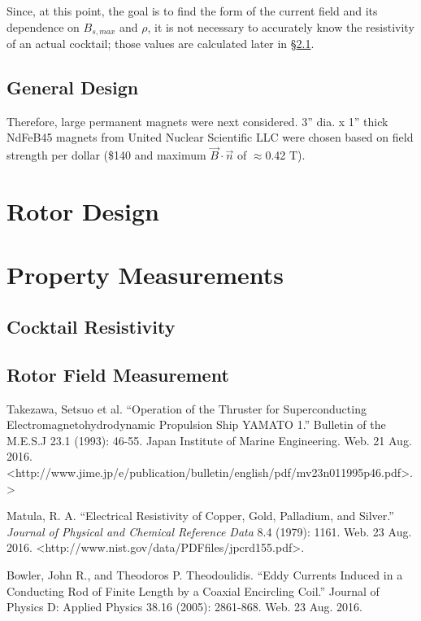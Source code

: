\documentclass[]{article}
\begin{document}
\par Since, at this point, the goal is to find the form of the current field and its dependence on $B_{s,max}$ and $\rho$, it is not necessary to accurately know the resistivity of an actual cocktail; those values are calculated later in \S\ref{sec:resistivity}.

\subsection{General Design}
\par Therefore, large permanent magnets were next considered. 3'' dia. x 1'' thick NdFeB45 magnets from United Nuclear Scientific LLC were chosen based on field strength per dollar (\$140 and maximum $\vec{B}\cdot\vec{n}$ of $\approx$0.42 T).

\section{Rotor Design}

\section{Property Measurements}
\subsection{Cocktail Resistivity}
\label{sec:resistivity}
\subsection{Rotor Field Measurement}



\begin{thebibliography}{3}
	Takezawa, Setsuo et al. ``Operation of the Thruster for Superconducting Electromagnetohydrodynamic Propulsion Ship YAMATO 1.'' Bulletin of the M.E.S.J 23.1 (1993): 46-55. Japan Institute of Marine Engineering. Web. 21 Aug. 2016. \textless http://www.jime.jp/e/publication/bulletin/english/pdf/mv23n011995p46.pdf>.\textgreater
	
	Matula, R. A. ``Electrical Resistivity of Copper, Gold, Palladium, and Silver.'' \textit{Journal of Physical and Chemical Reference Data} 8.4 (1979): 1161. Web. 23 Aug. 2016. \textless http://www.nist.gov/data/PDFfiles/jpcrd155.pdf\textgreater. 
	
	Bowler, John R., and Theodoros P. Theodoulidis. ``Eddy Currents Induced in a Conducting Rod of Finite Length by a Coaxial Encircling Coil.'' Journal of Physics D: Applied Physics 38.16 (2005): 2861-868. Web. 23 Aug. 2016. 
\end{thebibliography}
\end{document}
